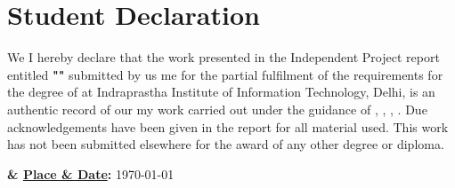 \chapter*{\centering \huge Student Declaration}

\begin{minipage}{\textwidth}
    \begin{flushleft}  
        \ifdefined\twoAuthor We \else I \fi
        hereby declare that the work presented in the Independent Project report entitled \textbf{"\projTitle"} submitted by 
        \ifdefined\twoAuthor us \else me \fi
        for the partial fulfilment of the requirements for the degree of \textit{\prog} at
        Indraprastha Institute of Information Technology, Delhi, is an authentic record of \ifdefined\twoAuthor our \else my \fi work carried out under the guidance of 
        \textbf{\advisorone}\ifx\advisortwo\empty\else, \textbf{\advisortwo}\fi\ifx\advisorthree\empty\else, \textbf{\advisorthree}\fi\ifx\advisorfour\empty\else, \textbf{\advisorfour}\fi. 
        Due acknowledgements have been given in the report for all material used. 
        This work has not been submitted elsewhere for the award of any other degree or diploma.


        \vspace{0.5in}

        \textbf{
            \projAuthorOneName
            \ifdefined\twoAuthor
                { \& \projAuthorTwoName}
            \fi
            } \hfill
        {\textbf{\underline{Place \& Date}:} \today} \\ 

    \end{flushleft}
\end{minipage}

\vfill

